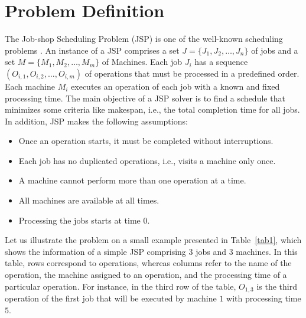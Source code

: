 \documentclass[runningheads]{llncs}
\begin{document}
\section{Problem Definition}
The Job-shop Scheduling Problem (JSP) is one of the well-known scheduling problems \cite{baker1974introduction,lenstra1979computational,taillard1993benchmarks}. An instance of a JSP comprises a set $J = \{ J_1, J_2, \dots ,J_n \}$  of jobs and a set $M = \{ M_1, M_2, \dots ,M_m \}$ of Machines. Each job $J_i$ has a sequence $(O_{i,1}, O_{i,2}, \dots ,O_{i,m})$ of operations that must be processed in a predefined order. Each machine $M_i$ executes an operation of each job with a known and fixed processing time. The main objective of a JSP solver is to find a schedule that minimizes some criteria like makespan, i.e., the total completion time for all jobs.
In addition, JSP makes the following assumptions:
\begin{itemize}
	\item Once an operation starts, it must be completed without interruptions.
	\item Each job has no duplicated operations, i.e., visits a machine only once.
	\item A machine cannot perform more than one operation at a time.
	\item All machines are available at all times.
	\item Processing the jobs starts at time 0.
\end{itemize}

Let us illustrate the problem on a small example presented in Table~\ref{tab1}, which shows the information of a simple JSP comprising $3$ jobs and $3$ machines. In this table, rows correspond to operations, whereas columns refer to the name of the operation, the machine assigned to an operation, and the processing time of a particular operation. For instance, in the third row of the table, $O_{1,3}$ is the third operation of the first job that will be executed by machine $1$ with processing time $5$. 
\end{document}
